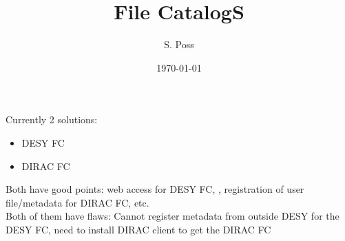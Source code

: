 \documentclass{beamer}
\author{S. Poss}
\institute[CERN]{CERN}
\title[]{File CatalogS}
\date{\today}
\begin{document}
\begin{frame}
	\titlepage
\end{frame}

\begin{frame}
Currently 2 solutions:
\begin{itemize}
  \item DESY FC
  \item DIRAC FC
\end{itemize}
Both have good points: web access for DESY FC, , registration of user
file/metadata for DIRAC FC, etc.\\
Both of them have flaws: Cannot register metadata from outside DESY for the DESY
FC, need to install DIRAC client to get the DIRAC FC
\end{frame}
\end{document}
